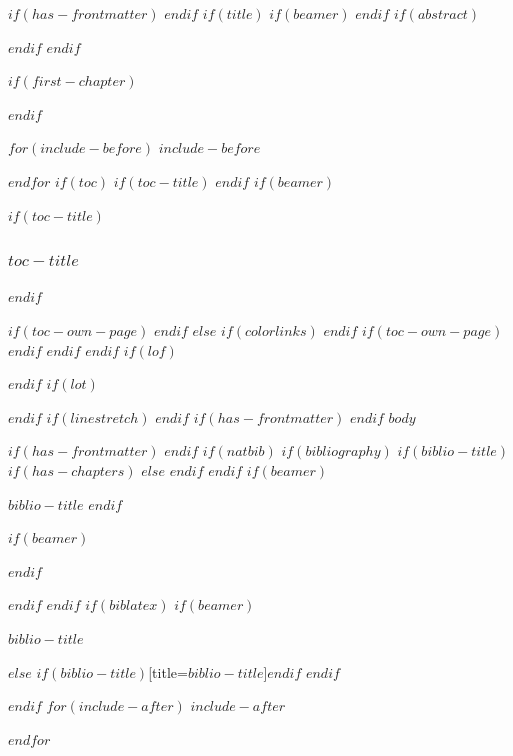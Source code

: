 \documentclass[
$if(fontsize)$
  $fontsize$,
$endif$
$if(papersize)$
  $papersize$paper,
$else$
  paper=a4,
$endif$
$if(beamer)$
  ignorenonframetext,
$if(handout)$
  handout,
$endif$
$if(aspectratio)$
  aspectratio=$aspectratio$,
$endif$
$if(babel-lang)$
  $babel-lang$,
$endif$
$endif$
$for(classoption)$
  $classoption$$sep$,
$endfor$
  ,captions=tableheading
]{$if(beamer)$$documentclass$$else$$if(book)$scrbook$else$scrartcl$endif$$endif$}
\newif\ifbibliography
\begin{document}

$if(has-frontmatter)$
\frontmatter
$endif$
$if(title)$
$if(beamer)$
\frame{\titlepage}
$endif$
$if(abstract)$
\begin{abstract}
$abstract$
\end{abstract}
$endif$
$endif$

$if(first-chapter)$
\setcounter{chapter}{$first-chapter$}
\addtocounter{chapter}{-1}
$endif$

$for(include-before)$
$include-before$

$endfor$
$if(toc)$
$if(toc-title)$
\renewcommand*\contentsname{$toc-title$}
$endif$
$if(beamer)$
\begin{frame}[allowframebreaks]
$if(toc-title)$
  \frametitle{$toc-title$}
$endif$
  \setcounter{tocdepth}{$toc-depth$}
  \tableofcontents
\end{frame}
$if(toc-own-page)$
\newpage
$endif$
$else$
{
$if(colorlinks)$
\hypersetup{linkcolor=$if(toccolor)$$toccolor$$else$$endif$}
$endif$
\setcounter{tocdepth}{$toc-depth$}
\tableofcontents
$if(toc-own-page)$
\newpage
$endif$
}
$endif$
$endif$
$if(lof)$
\listoffigures
$endif$
$if(lot)$
\listoftables
$endif$
$if(linestretch)$
$endif$
$if(has-frontmatter)$
\mainmatter
$endif$
$body$

$if(has-frontmatter)$
\backmatter
$endif$
$if(natbib)$
$if(bibliography)$
$if(biblio-title)$
$if(has-chapters)$
\renewcommand\bibname{$biblio-title$}
$else$
\renewcommand\refname{$biblio-title$}
$endif$
$endif$
$if(beamer)$
\begin{frame}[allowframebreaks]{$biblio-title$}
  \bibliographytrue
$endif$
  
$if(beamer)$
\end{frame}
$endif$

$endif$
$endif$
$if(biblatex)$
$if(beamer)$
\begin{frame}[allowframebreaks]{$biblio-title$}
  \bibliographytrue
  \printbibliography[heading=none]
\end{frame}
$else$
\printbibliography$if(biblio-title)$[title=$biblio-title$]$endif$
$endif$

$endif$
$for(include-after)$
$include-after$

$endfor$
\end{document}

